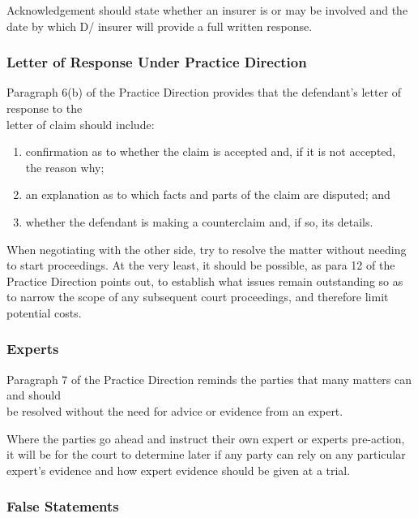 \documentclass[
]{article}
\providecommand{\tightlist}{%
  \setlength{\itemsep}{0pt}\setlength{\parskip}{0pt}}
\begin{document}
Acknowledgement should state whether an insurer is or may be involved
and the date by which D/ insurer will provide a full written response.

\hypertarget{letter-of-response-under-practice-direction}{%
\subsubsection{Letter of Response Under Practice
Direction}\label{letter-of-response-under-practice-direction}}

Paragraph 6(b) of the Practice Direction provides that the defendant's
letter of response to the\\
letter of claim should include:

\begin{enumerate}
\def\labelenumi{\arabic{enumi}.}
\tightlist
\item
  confirmation as to whether the claim is accepted and, if it is not
  accepted, the reason why;
\item
  an explanation as to which facts and parts of the claim are disputed;
  and
\item
  whether the defendant is making a counterclaim and, if so, its
  details.
\end{enumerate}

When negotiating with the other side, try to resolve the matter without
needing to start proceedings. At the very least, it should be possible,
as para 12 of the Practice Direction points out, to establish what
issues remain outstanding so as to narrow the scope of any subsequent
court proceedings, and therefore limit potential costs.

\hypertarget{experts}{%
\subsubsection{Experts}\label{experts}}

Paragraph 7 of the Practice Direction reminds the parties that many
matters can and should\\
be resolved without the need for advice or evidence from an expert.

Where the parties go ahead and instruct their own expert or experts
pre-action, it will be for the court to determine later if any party can
rely on any particular expert's evidence and how expert evidence should
be given at a trial.

\hypertarget{false-statements}{%
\subsubsection{False Statements}\label{false-statements}}
\end{document}
